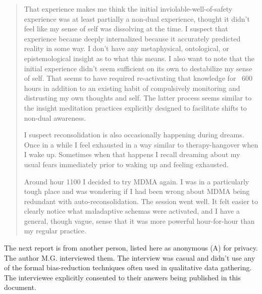 \documentclass[12pt,letterpaper]{book}
\begin{document}
\begin{quotation}
    That experience makes me think the initial inviolable-well-of-safety experience was at least partially a non-dual experience, thought it didn't feel like my sense of self was dissolving at the time. I suspect that experience became deeply internalized because it accurately predicted reality in some way. I don't have any metaphysical, ontological, or epistemological insight as to what this means. I also want to note that the initial experience didn't seem sufficient on its own to destabilize my sense of self. That seems to have required re-activating that knowledge for ~600 hours in addition to an existing habit of compulsively monitoring and distrusting my own thoughts and self. The latter process seems similar to the insight meditation practices explicitly designed to facilitate shifts to non-dual awareness.

    I suspect reconsolidation is also occasionally happening during dreams. Once in a while I feel exhausted in a way similar to therapy-hangover when I wake up. Sometimes when that happens I recall dreaming about my usual fears immediately prior to waking up and feeling exhausted.

    Around hour 1100 I decided to try MDMA again. I was in a particularly tough place and was wondering if I had been wrong about MDMA being redundant with auto-reconsolidation. The session went well. It felt easier to clearly notice what maladaptive schemas were activated, and I have a general, though vague, sense that it was more powerful hour-for-hour than my regular practice.
\end{quotation}
The next report is from another person, listed here as anonymous (A) for privacy. The author M.G. interviewed them. The interview was casual and didn't use any of the formal bias-reduction techniques often used in qualitative data gathering. The interviewee explicitly consented to their answers being published in this document.
\end{document}
